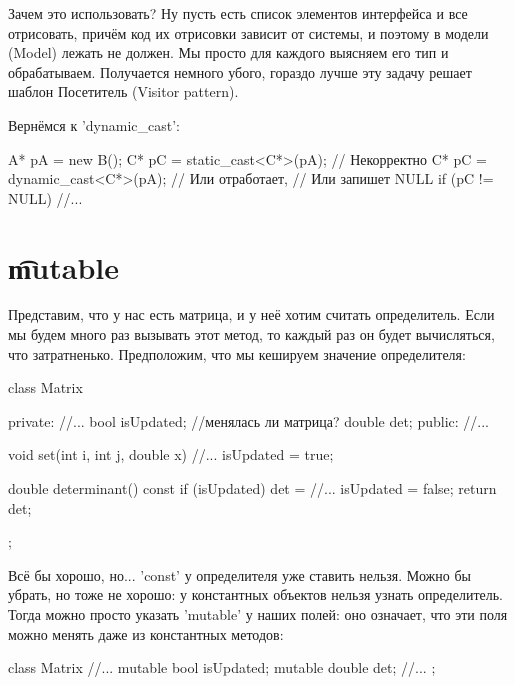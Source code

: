 Зачем это использовать?
Ну пусть есть список элементов интерфейса и все отрисовать, причём код их отрисовки зависит от системы,
и поэтому в модели (Model) лежать не должен.
Мы просто для каждого выясняем его тип и обрабатываем.
Получается немного убого, гораздо лучше эту задачу решает шаблон Посетитель (Visitor pattern).
 
Вернёмся к \cpp'dynamic_cast':
\begin{cppcode}
A* pA = new B();
C* pC = static_cast<C*>(pA); // Некорректно
C* pC = dynamic_cast<C*>(pA); // Или отработает,
                              // Или запишет NULL
if (pC != NULL)
        //...
\end{cppcode}
 
\section{\t{mutable}}
 
Представим, что у нас есть матрица, и у неё хотим считать определитель.
Если мы будем много раз вызывать этот метод, то каждый раз он будет вычисляться, что затратненько.
Предположим, что мы кешируем значение определителя:
\begin{cppcode}
class Matrix {
private:
        //...
        bool isUpdated; //менялась ли матрица?
        double det;
public:
        //...
 
        void set(int i, int j, double x) {
                //...
                isUpdated = true;
        }
 
        double determinant() const {
                if (isUpdated) {
                        det = //...
                        isUpdated = false;
                }
                return det;
        }
};
\end{cppcode}
Всё бы хорошо, но... \cpp'const' у определителя уже ставить нельзя.
Можно бы убрать, но тоже не хорошо: у константных объектов нельзя узнать определитель.
Тогда можно просто указать \cpp'mutable' у наших полей: оно означает, что эти поля можно менять даже из константных методов:
\begin{cppcode}
class Matrix {
        //...
        mutable bool isUpdated;
        mutable double det;
        //...  
};
\end{cppcode}